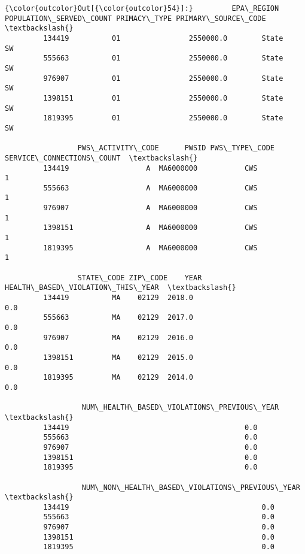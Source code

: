 \documentclass[11pt]{article}
\begin{document}
\begin{Verbatim}[commandchars=\\\{\}]
{\color{outcolor}Out[{\color{outcolor}54}]:}         EPA\_REGION  POPULATION\_SERVED\_COUNT PRIMACY\_TYPE PRIMARY\_SOURCE\_CODE  \textbackslash{}
         134419          01                2550000.0        State                  SW   
         555663          01                2550000.0        State                  SW   
         976907          01                2550000.0        State                  SW   
         1398151         01                2550000.0        State                  SW   
         1819395         01                2550000.0        State                  SW   
         
                 PWS\_ACTIVITY\_CODE      PWSID PWS\_TYPE\_CODE SERVICE\_CONNECTIONS\_COUNT  \textbackslash{}
         134419                  A  MA6000000           CWS                         1   
         555663                  A  MA6000000           CWS                         1   
         976907                  A  MA6000000           CWS                         1   
         1398151                 A  MA6000000           CWS                         1   
         1819395                 A  MA6000000           CWS                         1   
         
                 STATE\_CODE ZIP\_CODE    YEAR  HEALTH\_BASED\_VIOLATION\_THIS\_YEAR  \textbackslash{}
         134419          MA    02129  2018.0                               0.0   
         555663          MA    02129  2017.0                               0.0   
         976907          MA    02129  2016.0                               0.0   
         1398151         MA    02129  2015.0                               0.0   
         1819395         MA    02129  2014.0                               0.0   
         
                  NUM\_HEALTH\_BASED\_VIOLATIONS\_PREVIOUS\_YEAR  \textbackslash{}
         134419                                         0.0   
         555663                                         0.0   
         976907                                         0.0   
         1398151                                        0.0   
         1819395                                        0.0   
         
                  NUM\_NON\_HEALTH\_BASED\_VIOLATIONS\_PREVIOUS\_YEAR  \textbackslash{}
         134419                                             0.0   
         555663                                             0.0   
         976907                                             0.0   
         1398151                                            0.0   
         1819395                                            0.0   
         

\end{Verbatim}
\end{document}
